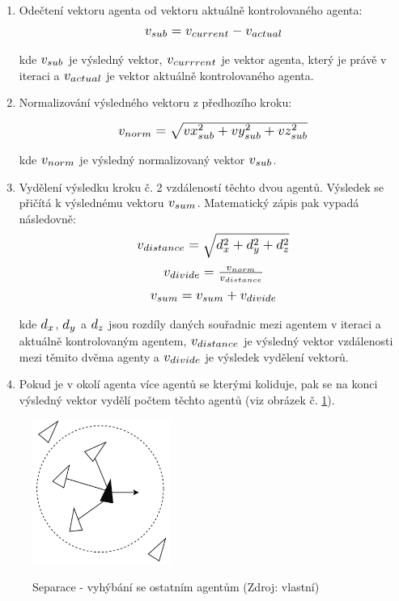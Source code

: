 \documentclass[czech,public,dept460,male,cpdeclaration]{diploma}
\begin{document}
\begin{enumerate}
	\item Odečtení vektoru agenta od vektoru aktuálně kontrolovaného agenta:
			\[ \scalebox{1.2}{$v_{sub} = v_{current} - v_{actual}$} \]
			
			kde \( \scalebox{1.2}{$v_{sub}$} \) je výsledný vektor, \( \scalebox{1.2}{$v_{currrent}$} \) je vektor agenta, který je právě v iteraci a \( \scalebox{1.2}{$v_{actual}$} \) je vektor aktuálně kontrolovaného agenta.

	\item Normalizování výsledného vektoru z předhozího kroku:
	
			\[ \scalebox{1.2}{$v_{norm} = \sqrt{vx_{sub}^2 + vy_{sub}^2 + vz_{sub}^2}$} \]
			
			kde \( \scalebox{1.2}{$v_{norm}$} \) je výsledný normalizovaný vektor \( \scalebox{1.2}{$v_{sub}$} \).
	\item Vydělení výsledku kroku č. 2 vzdáleností těchto dvou agentů. Výsledek se přičítá k výslednému vektoru \( \scalebox{1.2}{$v_{sum}$} \). Matematický zápis pak vypadá následovně:
			\[ \scalebox{1.2}{$v_{distance} = \sqrt{d_x^2 + d_y^2 + d_z^2}$} \]
			\[ \scalebox{1.2}{$v_{divide} = \frac{v_{norm}}{v_{distance}}$} \]
			\[ \scalebox{1.2}{$v_{sum} = v_{sum} + v_{divide}$} \]
						
			kde \( \scalebox{1.2}{$d_{x}$} \), \( \scalebox{1.2}{$d_{y}$} \) a \( \scalebox{1.2}{$d_{z}$} \) jsou rozdíly daných souřadnic mezi agentem v iteraci a aktuálně kontrolovaným agentem, \( \scalebox{1.2}{$v_{distance}$} \) je výsledný vektor vzdálenosti mezi těmito dvěma agenty a \( \scalebox{1.2}{$v_{divide}$} \) je výsledek vydělení vektorů.
			
	\item Pokud je v okolí agenta více agentů se kterými koliduje, pak se na konci výsledný vektor vydělí počtem těchto agentů (viz obrázek č. \ref{fig:separationImg}).
\end{enumerate}

\begin{figure}[H]\centering\includegraphics[width=0.4\textwidth]{Figures/separation2.jpg}\label{fig:separationImg}
	\caption{Separace - vyhýbání se ostatním agentům (Zdroj: vlastní)}\label{fig:separationImg}
\end{figure}
\end{document}
